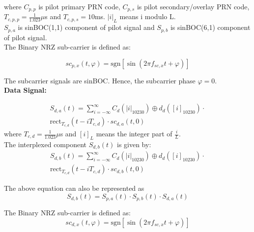 \documentclass[conference]{IEEEtran}
\begin{document}
\noindent where $C_{p,p}$ is pilot primary PRN code, $C_{p,s}$ is pilot secondary/overlay PRN code, 
$T_{c,p,p} = \frac{1}{1.023}\mu$s and $T_{c,p,s}= 10$ms. $|i|_{L}$ means i modulo L.\\

\noindent $S_{p,a}$ is sinBOC(1,1) component of pilot signal and $S_{p,b}$ is sinBOC(6,1) component 
of pilot signal.
\\

\noindent The Binary NRZ sub-carrier is defined as:

\begin{equation}
sc_{p,x}(t, \varphi) = \text{sgn}[\sin(2\pi f_{sc,x}t + \varphi)]
\label{eq:sub_carrier}
\end{equation}

\noindent The subcarrier signals are sinBOC. Hence, the subcarrier phase $\varphi=0$. \\

\noindent\textbf{Data Signal:}

\begin{multline}
S_{d,a}(t) = \sum_{i=-\infty}^{\infty} C_d(|i|_{10230}  ) \oplus d_d([i]_{10230}) \cdot \\
\text{rect} _{T_{c,d}} \left({t - iT_{c,d}}\right) \cdot sc_{d,a}(t, 0)
\label{eq:signal_da}
\end{multline}
\noindent where $T_{c,d} = \frac{1}{1.023}\mu$s and $[i]_L$ means the integer part of $\frac{i}{L}$.\\

\noindent The interplexed component $S_{d,b}(t)$ is given by:
\begin{multline}
S_{d,b}(t) = \sum_{i=-\infty}^{\infty} C_d(|i|_{10230}) \oplus d_d([i]_{10230}) \cdot \\
\text{rect}_{T_{c,d}} \left( t - iT_{c,d} \right) \cdot sc_{d,b}(t, 0)
\label{eq:interplexed_component}
\end{multline}

\noindent The above equation can also be represented as
\begin{equation}
    S_{d,b}(t) = S_{p,a}(t) \cdot S_{p,b}(t) \cdot S_{d,a}(t)
    \label{eq:interplexed_component1}
\end{equation}

\noindent The Binary NRZ sub-carrier is defined as:
\begin{equation}
sc_{d,x}(t, \varphi) = \text{sgn}[\sin(2\pi f_{sc,x}t + \varphi)]
\label{eq:subcarrier_dc}
\end{equation}
\end{document}
